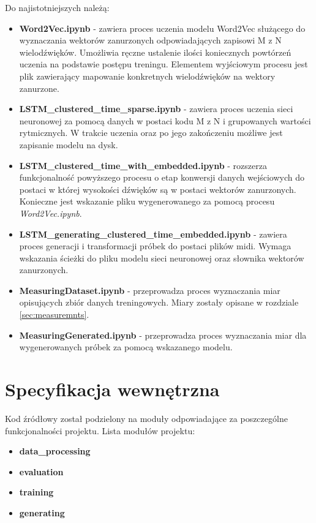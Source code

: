 {{        Do najistotniejszych należą:
        \begin{itemize}
            \setlength\itemsep{-0.5em}
            \item {\textbf {{Word2Vec.ipynb}}} - zawiera proces uczenia modelu Word2Vec służącego do wyznaczania wektorów zanurzonych odpowiadających zapisowi M\,\,z\,\,N wielodźwięków. Umożliwia ręczne ustalenie ilości koniecznych powtórzeń uczenia na podstawie postępu treningu. Elementem wyjściowym procesu jest plik zawierający mapowanie konkretnych wielodźwięków na wektory zanurzone.
            \item {\textbf {{LSTM\_clustered\_time\_sparse.ipynb}}} - zawiera proces uczenia sieci neuronowej za pomocą danych w postaci kodu M\,\,z\,\,N i grupowanych wartości rytmicznych. W trakcie uczenia oraz po jego zakończeniu możliwe jest zapisanie modelu na dysk.
            \item {\textbf {{LSTM\_clustered\_time\_with\_embedded.ipynb}}} - rozszerza funkcjonalność powyższego procesu o etap konwersji danych wejściowych do postaci w której wysokości dźwięków są w postaci wektorów zanurzonych. Konieczne jest wskazanie pliku wygenerowanego za pomocą procesu {\textit {{Word2Vec.ipynb}}}.
            \item {\textbf {LSTM\_generating\_clustered\_time\_embedded.ipynb}} - zawiera proces generacji i transformacji próbek do postaci plików midi. Wymaga wskazania ścieżki do pliku modelu sieci neuronowej oraz słownika wektorów zanurzonych.
            \item {\textbf {{MeasuringDataset.ipynb}}} - przeprowadza proces wyznaczania miar opisujących zbiór danych treningowych. Miary zostały opisane w rozdziale \ref{sec:measuremnts}.
            \item {\textbf {{MeasuringGenerated.ipynb}}} - przeprowadza proces wyznaczania miar dla wygenerowanych próbek za pomocą wskazanego modelu. 
        \end{itemize}
    }

    \section{Specyfikacja wewnętrzna}
    {
        Kod źródłowy został podzielony na moduły odpowiadające za poszczególne funkcjonalności projektu. Lista modułów projektu:

        \begin{itemize}
            \setlength\itemsep{-0.5em}
            \item {\textbf {data\_processing}} 
            \item {\textbf {evaluation}}
            \item {\textbf {training}}
            \item {\textbf {generating}}
        \end{itemize}

}}
